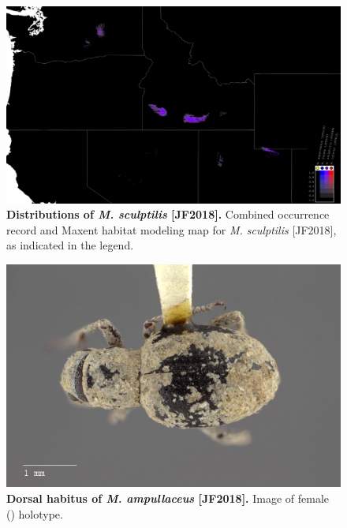 \documentclass[fleqn,10pt,lineno]{wlpeerj} %
\begin{document}
\begin{figure}[h]
	\centering
	\begin{sideways}
		\includegraphics[height=0.85\textwidth]{figure7.png}
		\end{sideways}
	\caption{\textbf{Distributions of \textit{M. sculptilis} [JF2018].} Combined occurrence record and Maxent habitat modeling map for \textit{M. sculptilis} [JF2018], as indicated in the legend.}
	\label{fig:map_sculptilis}
\end{figure}

\begin{figure}[h]
	\begin{sideways}
		\centering
		\includegraphics[height=\textwidth]{figure8.jpg}
	\end{sideways}
	\caption{\textbf{Dorsal habitus of \textit{M. ampullaceus} [JF2018].} Image of female (\female) holotype.}
	\label{fig:ampullaceus_F_dorsal}
\end{figure}
\end{document}
